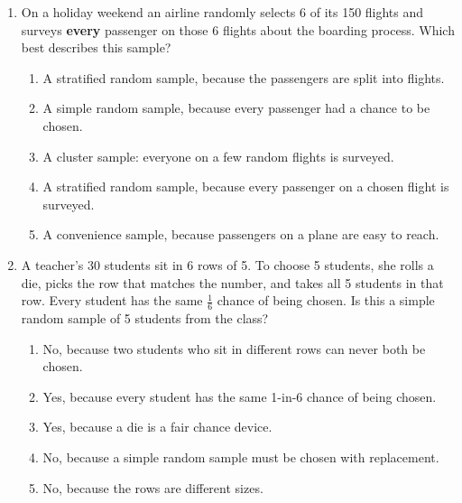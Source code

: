 \documentclass[12pt]{article}
\begin{document}
\begin{enumerate}[leftmargin=1.9em, itemsep=0.13in]
  \boxguard[12]
  \item On a holiday weekend an airline randomly selects 6 of its 150 flights and surveys
        \textbf{every} passenger on those 6 flights about the boarding process. Which best
        describes this sample?
        \begin{enumerate}[label=\textbf{(\Alph*)}, leftmargin=2.2em, itemsep=2pt]
          \item A stratified random sample, because the passengers are split into flights.
          \item A simple random sample, because every passenger had a chance to be chosen.
          \item A cluster sample: everyone on a few random flights is surveyed.
          \item A stratified random sample, because every passenger on a chosen flight is surveyed.
          \item A convenience sample, because passengers on a plane are easy to reach.\hfill{}\rule[-0.2in]{0pt}{0.48in}
        \end{enumerate}

  \boxguard[13]
  \item A teacher's 30 students sit in 6 rows of 5. To choose 5 students, she rolls a die,
        picks the row that matches the number, and takes all 5 students in that row. Every
        student has the same $\tfrac{1}{6}$ chance of being chosen. Is this a simple random
        sample of 5 students from the class?
        \begin{enumerate}[label=\textbf{(\Alph*)}, leftmargin=2.2em, itemsep=2pt]
          \item No, because two students who sit in different rows can never both be chosen.
          \item Yes, because every student has the same 1-in-6 chance of being chosen.
          \item Yes, because a die is a fair chance device.
          \item No, because a simple random sample must be chosen with replacement.
          \item No, because the rows are different sizes.\hfill{}\rule[-0.2in]{0pt}{0.48in}
        \end{enumerate}


\end{enumerate}
\end{document}
